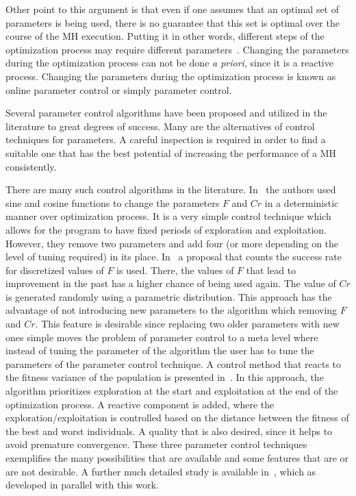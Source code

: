 Other point to this argument is that even if one assumes that an
optimal set of parameters is being used, there is no guarantee that
this set is optimal over the course of the \ac{MH} execution. Putting it
in other words, different steps of the optimization process may require
different parameters~\cite{narloch2017protein}.
Changing the parameters during the optimization
process can not be done \textit{a priori}, since it is a reactive process.
Changing the parameters during the optimization process is known as
online parameter control or simply parameter control.

Several parameter control algorithms have been proposed and utilized
in the literature to great degrees of success. Many are the alternatives
of control techniques for parameters. A careful inspection is
required in order to find a suitable one that has the best
potential of increasing the performance of a \ac{MH} consistently.

There are many such control algorithms in the literature.
In~\cite{huang2013improved} the authors used sine and cosine functions
to change the parameters $F$ and $Cr$ in a deterministic manner
over optimization process. It is a very simple control technique
which allows for the program to have fixed periods of
exploration and exploitation. However, they remove two parameters
and add four (or more depending on the level of tuning required) in its place.
In~\cite{kovavcevic2014vns} a proposal that counts the success rate for discretized
values of $F$ is used. There, the values of $F$ that lead to improvement in the past
has a higher chance of being used again. The value of $Cr$ is generated randomly using
a parametric distribution. This approach has the advantage of
not introducing new parameters to the algorithm which removing $F$ and $Cr$.
This feature is desirable since replacing two older parameters with new ones
simple moves the problem of parameter control to a meta level where
instead of tuning the parameter of the algorithm the user has to tune
the parameters of the parameter control technique.
A control method that reacts to the fitness variance of the population
is presented in~\cite{ali2004population}. In this approach, the algorithm
prioritizes exploration at the start and exploitation at the end of the optimization
process. A reactive component is added, where the exploration/exploitation is controlled
based on the distance between the fitness of the best and worst individuals.
A quality that is also desired, since it helps to avoid premature convergence.
These three parameter control techniques exemplifies the many possibilities
that are available and some features that are or are not desirable. A further
much detailed study is available in~\cite{parpinelli18review},
which as developed in parallel with this work.

